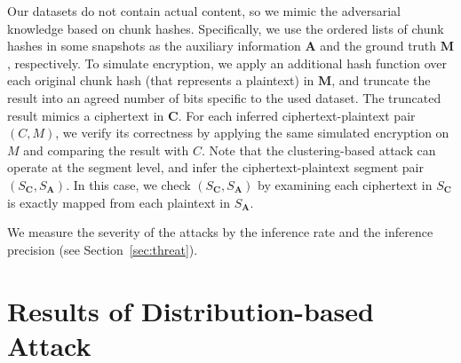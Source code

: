 \documentclass[bachelor]{thesis-uestc}
\begin{document}
Our datasets do not contain actual content, so we mimic the adversarial
knowledge based on chunk hashes. Specifically, we use the ordered lists of
chunk hashes in some snapshots as the auxiliary information $\mathbf{A}$ and
the ground truth $\mathbf{M}$, respectively. To simulate encryption, we apply
an additional hash function over each original chunk hash (that represents a
plaintext) in $\mathbf{M}$, and truncate the result into an agreed number of
bits specific to the used dataset. The truncated result mimics a ciphertext in
$\mathbf{C}$. For each inferred ciphertext-plaintext pair $(C, M)$, we verify
its correctness by applying the same simulated encryption on $M$ and comparing
the result with $C$. Note that the clustering-based attack can operate at the
segment level, and infer the ciphertext-plaintext segment pair $(S_\mathbf{C},
S_\mathbf{A})$.  In this case, we check $(S_\mathbf{C}, S_\mathbf{A})$ by
examining each ciphertext in $S_\mathbf{C}$ is exactly mapped from each
plaintext in $S_\mathbf{A}$.


We measure the severity of the attacks by the inference rate and the inference
precision (see Section~\ref{sec:threat}). 

\section{Results of Distribution-based Attack}
\label{sec:experiment-distribution}
\end{document}
